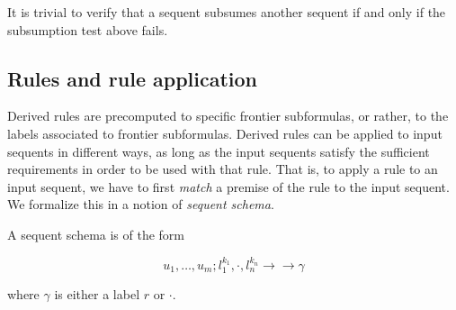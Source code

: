 \documentclass{article}
\theoremstyle{definition}
\newcommand{\fneuseqsymb}{
  \mathrel{\longrightarrow\!\!\!\!\!\!\!\!\longrightarrow}}
\newcommand{\labels}[2]{#1 \, \# \, #2}
\begin{document}
It is trivial to verify that a sequent subsumes another sequent if and only if
the subsumption test above fails.

\subsection{Rules and rule application}




Derived rules are precomputed to specific frontier subformulas, or rather, to
the labels associated to frontier subformulas. Derived rules can be applied to
input sequents in different ways, as long as the input sequents satisfy the
sufficient requirements in order to be used with that rule. That is, to apply a
rule to an input sequent, we have to first \emph{match} a premise of the rule to
the input sequent. We formalize this in a notion of \emph{sequent schema}.

\begin{definition}
  A sequent schema is of the form

  \[
    u_1, \dots, u_m ; l_1^{k_1}, \cdot, l_n^{k_n} \fneuseqsymb \gamma
  \]

  where $\gamma$ is either a label $r$ or $\cdot$.
\end{definition}
\end{document}
